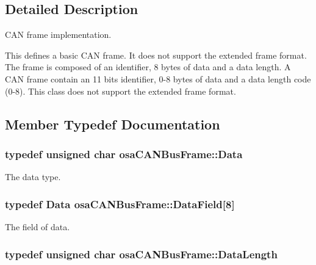 \subsection{Detailed Description}
C\+A\+N frame implementation. 

This defines a basic C\+A\+N frame. It does not support the extended frame format. The frame is composed of an identifier, 8 bytes of data and a data length. A C\+A\+N frame contain an 11 bits identifier, 0-\/8 bytes of data and a data length code (0-\/8). This class does not support the extended frame format. 

\subsection{Member Typedef Documentation}
\hypertarget{classosa_c_a_n_bus_frame_a938f540c9de33b240d3bc4f21c341ba5}{}
\subsubsection[{Data}]{\setlength{\rightskip}{0pt plus 5cm}typedef unsigned char {\bf osa\+C\+A\+N\+Bus\+Frame\+::\+Data}}\label{classosa_c_a_n_bus_frame_a938f540c9de33b240d3bc4f21c341ba5}


The data type. 

\hypertarget{classosa_c_a_n_bus_frame_ac41162892eefb85a1308d485ec630969}{}
\subsubsection[{Data\+Field}]{\setlength{\rightskip}{0pt plus 5cm}typedef {\bf Data} osa\+C\+A\+N\+Bus\+Frame\+::\+Data\+Field\mbox{[}8\mbox{]}}\label{classosa_c_a_n_bus_frame_ac41162892eefb85a1308d485ec630969}


The field of data. 

\hypertarget{classosa_c_a_n_bus_frame_ab5bacbd4959a9046925438af889744f4}{}
\subsubsection[{Data\+Length}]{\setlength{\rightskip}{0pt plus 5cm}typedef unsigned char {\bf osa\+C\+A\+N\+Bus\+Frame\+::\+Data\+Length}}\label{classosa_c_a_n_bus_frame_ab5bacbd4959a9046925438af889744f4}


